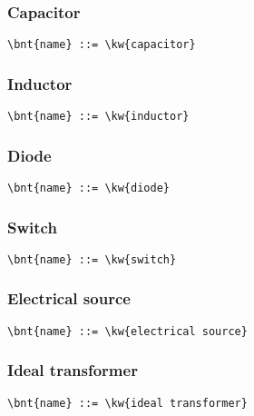 \subsubsection{Capacitor}
\begin{Verbatim}[commandchars=\\\{\}]
    \bnt{name} ::= \kw{capacitor}
\end{Verbatim}

\subsubsection{Inductor}
\begin{Verbatim}[commandchars=\\\{\}]
    \bnt{name} ::= \kw{inductor}
\end{Verbatim}

\subsubsection{Diode}
\begin{Verbatim}[commandchars=\\\{\}]
    \bnt{name} ::= \kw{diode}
\end{Verbatim}

\subsubsection{Switch}
\begin{Verbatim}[commandchars=\\\{\}]
    \bnt{name} ::= \kw{switch}
\end{Verbatim}

\subsubsection{Electrical source}
\begin{Verbatim}[commandchars=\\\{\}]
    \bnt{name} ::= \kw{electrical source}
\end{Verbatim}

\subsubsection{Ideal transformer}
\begin{Verbatim}[commandchars=\\\{\}]
    \bnt{name} ::= \kw{ideal transformer}
\end{Verbatim}

